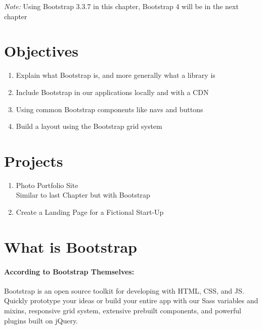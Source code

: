 \documentclass{article}
\begin{document}
	
	\title{}
	\author{Nico Limacher}
	
\maketitle

\textit{Note:} Using Bootstrap 3.3.7 in this chapter, Bootstrap 4 will be in the next chapter
\section{Objectives}

	\begin{enumerate}
		\itemsep0em
		\item Explain what Bootstrap is, and more generally what a library is
		\item Include Bootstrap in our applications locally and with a CDN
		\item Using common Bootstrap components like navs and buttons
		\item Build a layout using the Bootstrap grid system
	\end{enumerate}

\section{Projects}

	\begin{enumerate}
		\itemsep0em
		\item Photo Portfolio Site
		\\Similar to last Chapter but with Bootstrap
		\item Create a Landing Page for a Fictional Start-Up
		\\
	\end{enumerate}

\section{What is Bootstrap}

	\paragraph*{According to Bootstrap Themselves:} Bootstrap is an open source toolkit for developing with HTML, CSS, and JS. Quickly prototype your ideas or build your entire app with our Sass variables and mixins, responsive grid system, extensive prebuilt components, and powerful plugins built on jQuery.
	
\end{document}
